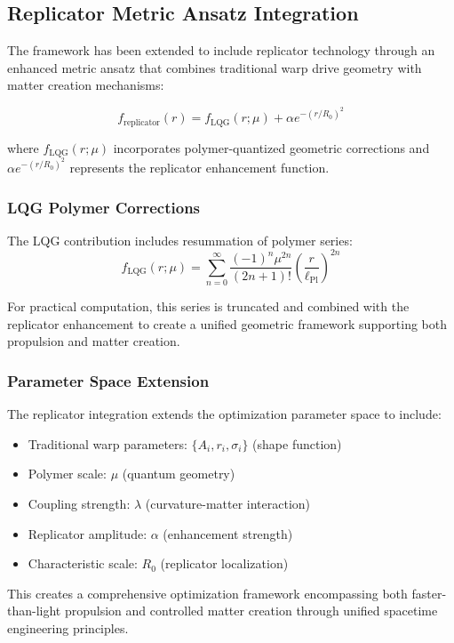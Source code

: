 \documentclass[11pt]{article}
\begin{document}
\subsection*{Replicator Metric Ansatz Integration}

The framework has been extended to include replicator technology through an enhanced metric ansatz that combines traditional warp drive geometry with matter creation mechanisms:

\[
f_{\text{replicator}}(r) = f_{\text{LQG}}(r;\mu) + \alpha e^{-(r/R_0)^2}
\]

where $f_{\text{LQG}}(r;\mu)$ incorporates polymer-quantized geometric corrections and $\alpha e^{-(r/R_0)^2}$ represents the replicator enhancement function.

\subsubsection*{LQG Polymer Corrections}

The LQG contribution includes resummation of polymer series:
\[
f_{\text{LQG}}(r;\mu) = \sum_{n=0}^{\infty} \frac{(-1)^n \mu^{2n}}{(2n+1)!} \left(\frac{r}{\ell_{\text{Pl}}}\right)^{2n}
\]

For practical computation, this series is truncated and combined with the replicator enhancement to create a unified geometric framework supporting both propulsion and matter creation.

\subsubsection*{Parameter Space Extension}

The replicator integration extends the optimization parameter space to include:
\begin{itemize}
\item Traditional warp parameters: $\{A_i, r_i, \sigma_i\}$ (shape function)
\item Polymer scale: $\mu$ (quantum geometry)
\item Coupling strength: $\lambda$ (curvature-matter interaction)
\item Replicator amplitude: $\alpha$ (enhancement strength)
\item Characteristic scale: $R_0$ (replicator localization)
\end{itemize}

This creates a comprehensive optimization framework encompassing both faster-than-light propulsion and controlled matter creation through unified spacetime engineering principles.
\end{document}

